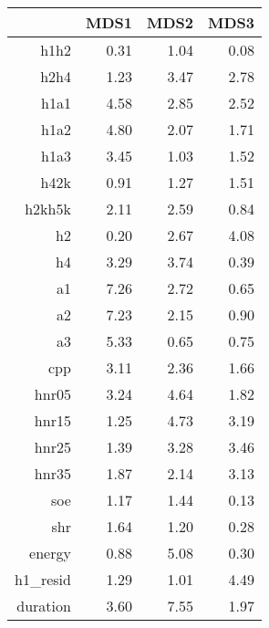 \begin{table}[ht]
\centering
\begin{tabular}{rrrr}
  \hline
 & MDS1 & MDS2 & MDS3 \\ 
  \hline
h1h2 & 0.31 & 1.04 & 0.08 \\ 
  h2h4 & 1.23 & 3.47 & 2.78 \\ 
  h1a1 & 4.58 & 2.85 & 2.52 \\ 
  h1a2 & 4.80 & 2.07 & 1.71 \\ 
  h1a3 & 3.45 & 1.03 & 1.52 \\ 
  h42k & 0.91 & 1.27 & 1.51 \\ 
  h2kh5k & 2.11 & 2.59 & 0.84 \\ 
  h2 & 0.20 & 2.67 & 4.08 \\ 
  h4 & 3.29 & 3.74 & 0.39 \\ 
  a1 & 7.26 & 2.72 & 0.65 \\ 
  a2 & 7.23 & 2.15 & 0.90 \\ 
  a3 & 5.33 & 0.65 & 0.75 \\ 
  cpp & 3.11 & 2.36 & 1.66 \\ 
  hnr05 & 3.24 & 4.64 & 1.82 \\ 
  hnr15 & 1.25 & 4.73 & 3.19 \\ 
  hnr25 & 1.39 & 3.28 & 3.46 \\ 
  hnr35 & 1.87 & 2.14 & 3.13 \\ 
  soe & 1.17 & 1.44 & 0.13 \\ 
  shr & 1.64 & 1.20 & 0.28 \\ 
  energy & 0.88 & 5.08 & 0.30 \\ 
  h1\_resid & 1.29 & 1.01 & 4.49 \\ 
  duration & 3.60 & 7.55 & 1.97 \\ 
   \hline
\end{tabular}
\end{table}
